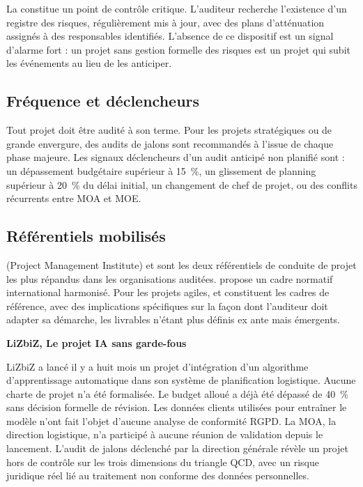 La  constitue un point de contrôle critique. L'auditeur recherche l'existence d'un registre des risques, régulièrement mis à jour, avec des plans d'atténuation assignés à des responsables identifiés. L'absence de ce dispositif est un signal d'alarme fort : un projet sans gestion formelle des risques est un projet qui subit les événements au lieu de les anticiper.

\subsection{Fréquence et déclencheurs}

Tout projet doit être audité à son terme. Pour les projets stratégiques ou de grande envergure, des audits de jalons sont recommandés à l'issue de chaque phase majeure. Les signaux déclencheurs d'un audit anticipé non planifié sont : un dépassement budgétaire supérieur à 15~\%, un glissement de planning supérieur à 20~\% du délai initial, un changement de chef de projet, ou des conflits récurrents entre MOA et MOE.

\subsection{Référentiels mobilisés}

 (Project Management Institute) et  sont les deux référentiels de conduite de projet les plus répandus dans les organisations auditées.  propose un cadre normatif international harmonisé. Pour les projets agiles,  et  constituent les cadres de référence, avec des implications spécifiques sur la façon dont l'auditeur doit adapter sa démarche, les livrables n'étant plus définis ex ante mais émergents.

\begin{boxlizbiz}
\textbf{LiZbiZ, Le projet IA sans garde-fous}

LiZbiZ a lancé il y a huit mois un projet d'intégration d'un algorithme d'apprentissage automatique dans son système de planification logistique. Aucune charte de projet n'a été formalisée. Le budget alloué a déjà été dépassé de 40~\% sans décision formelle de révision. Les données clients utilisées pour entraîner le modèle n'ont fait l'objet d'aucune analyse de conformité RGPD. La MOA, la direction logistique, n'a participé à aucune réunion de validation depuis le lancement. L'audit de jalons déclenché par la direction générale révèle un projet hors de contrôle sur les trois dimensions du triangle QCD, avec un risque juridique réel lié au traitement non conforme des données personnelles.
\end{boxlizbiz}


